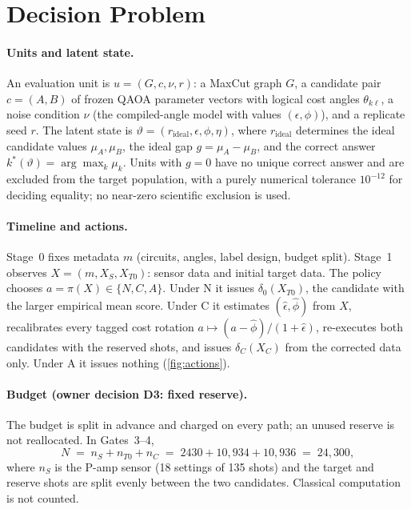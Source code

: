 \documentclass[10pt,twocolumn]{article}
\theoremstyle{definition}
\theoremstyle{remark}
\newcommand{\eps}{\epsilon}
\newcommand{\vt}{\vartheta}
\begin{document}
\section{Decision Problem}\label{sec:decision}

\paragraph{Units and latent state.} An evaluation unit is $u=(G,c,\nu,r)$: a MaxCut graph $G$, a candidate pair $c=(A,B)$ of frozen QAOA parameter vectors with logical cost angles $\theta_{k\ell}$, a noise condition $\nu$ (the compiled-angle model with values $(\eps,\phi)$), and a replicate seed $r$. The latent state is $\vt=(r_{\mathrm{ideal}},\eps,\phi,\eta)$, where $r_{\mathrm{ideal}}$ determines the ideal candidate values $\mu_A,\mu_B$, the ideal gap $g=\mu_A-\mu_B$, and the correct answer $k^*(\vt)=\arg\max_k\mu_k$. Units with $g=0$ have no unique correct answer and are excluded from the target population, with a purely numerical tolerance $10^{-12}$ for deciding equality; no near-zero scientific exclusion is used.

\paragraph{Timeline and actions.} Stage~0 fixes metadata $m$ (circuits, angles, label design, budget split). Stage~1 observes $X=(m,X_S,X_{T0})$: sensor data and initial target data. The policy chooses $a=\pi(X)\in\{N,C,A\}$. Under N it issues $\delta_0(X_{T0})$, the candidate with the larger empirical mean score. Under C it estimates $(\hat\eps,\hat\phi)$ from $X$, recalibrates every tagged cost rotation $a\mapsto(a-\hat\phi)/(1+\hat\eps)$, re-executes both candidates with the reserved shots, and issues $\delta_C(X_C)$ from the corrected data only. Under A it issues nothing (\cref{fig:actions}).

\paragraph{Budget (owner decision D3: fixed reserve).} The budget is split in advance and charged on every path; an unused reserve is not reallocated. In Gates~3--4,
\[
N \;=\; n_S+n_{T0}+n_C \;=\; 2430+10{,}934+10{,}936 \;=\; 24{,}300,
\]
where $n_S$ is the P-amp sensor (18 settings of 135 shots) and the target and reserve shots are split evenly between the two candidates. Classical computation is not counted.
\end{document}
